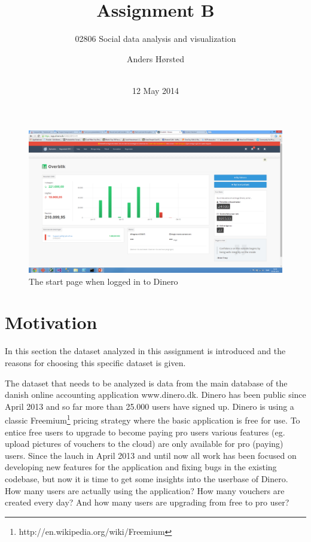 \documentclass{acm_proc_article-sp}
\begin{document}
\title{Assignment B}
\subtitle{02806 Social data analysis and visualization}

\author{
\alignauthor
Anders Hørsted\\
       \\
}

\date{12 May 2014}

\maketitle

\begin{figure}
    \centering
    \includegraphics[width=\columnwidth]{dinero-home-screenshot.png}
    \caption{The start page when logged in to Dinero}
    \label{fig:homepage}
\end{figure}

\section{Motivation}
In this section the dataset analyzed in this assignment is introduced and the reasons for choosing this specific dataset is given.

The dataset that needs to be analyzed is data from the main database of the danish online accounting application www.dinero.dk. Dinero has been public since April 2013 and so far more than 25.000 users have signed up. Dinero is using a classic Freemium\footnote{http://en.wikipedia.org/wiki/Freemium} pricing strategy where the basic application is free for use. To entice free users to upgrade to become paying pro users various features (eg. upload pictures of vouchers to the cloud) are only available for pro (paying) users. Since the lauch in April 2013 and until now all work has been focused on developing new features for the application and fixing bugs in the existing codebase, but now it is time to get some insights into the userbase of Dinero. How many users are actually using the application? How many vouchers are created every day? And how many users are upgrading from free to pro user?
\end{document}
